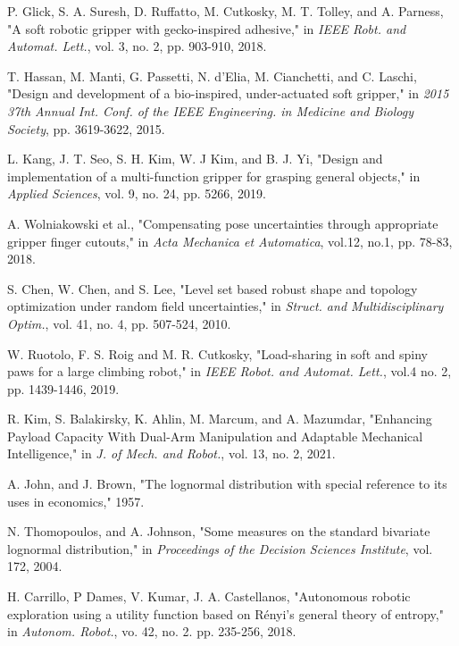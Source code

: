 \documentclass[letterpaper, 10 pt, conference]{ieeeconf}  %
\begin{document}
\begin{thebibliography}{99}
 P. Glick, S. A. Suresh, D. Ruffatto, M. Cutkosky, M. T. Tolley, and A. Parness, "A soft robotic gripper with gecko-inspired adhesive," in \emph{IEEE Robt. and Automat. Lett.}, vol. 3, no. 2, pp. 903-910, 2018.

 T. Hassan, M. Manti, G. Passetti, N. d'Elia, M. Cianchetti, and C. Laschi, "Design and development of a bio-inspired, under-actuated soft gripper," in \emph{2015 37th Annual Int. Conf. of the IEEE Engineering. in Medicine and Biology Society}, pp. 3619-3622, 2015.



 L. Kang, J. T. Seo, S. H. Kim, W. J Kim, and B. J. Yi, "Design and implementation of a multi-function gripper for grasping general objects," in \emph{Applied Sciences}, vol. 9, no. 24, pp. 5266, 2019.

 A. Wolniakowski et al., "Compensating pose uncertainties through appropriate gripper finger cutouts," in \emph{Acta Mechanica et Automatica}, vol.12, no.1, pp. 78-83, 2018.

 S. Chen, W. Chen, and S. Lee, "Level set based robust shape and topology optimization under random field uncertainties," in \emph{Struct. and Multidisciplinary Optim.}, vol. 41, no. 4, pp. 507-524, 2010.

 W. Ruotolo, F. S. Roig and M. R. Cutkosky, "Load-sharing in soft and spiny paws for a large climbing robot," in \emph{IEEE Robot. and Automat. Lett.}, vol.4 no. 2, pp. 1439-1446, 2019.

 R. Kim, S. Balakirsky, K. Ahlin, M. Marcum, and A. Mazumdar, "Enhancing Payload Capacity With Dual-Arm Manipulation and Adaptable Mechanical Intelligence," in \emph{J. of Mech. and Robot.}, vol. 13, no. 2, 2021.

 A. John, and J. Brown, "The lognormal distribution with special reference to its uses in economics," 1957. 

 N. Thomopoulos, and A. Johnson, "Some measures on the standard bivariate lognormal distribution," in \emph{Proceedings of the Decision Sciences Institute}, vol. 172, 2004.

 H. Carrillo, P Dames, V. Kumar, J. A. Castellanos, "Autonomous robotic exploration using a utility function based on R{\'e}nyi’s general theory of entropy," in \emph{Autonom. Robot.}, vo. 42, no. 2. pp. 235-256, 2018. 


\end{thebibliography}
\end{document}
